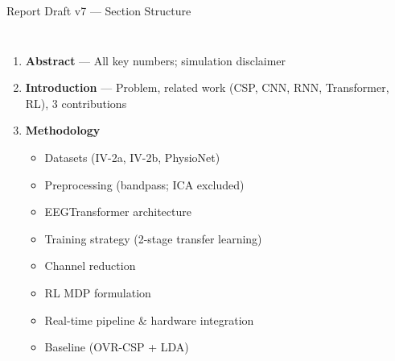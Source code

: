 \documentclass[aspectratio=169, 11pt]{beamer}
\begin{document}
\begin{frame}{Report Draft v7 --- Section Structure}

    \begin{columns}[T]
        \begin{enumerate}
            \item \textbf{Abstract} --- All key numbers; simulation disclaimer
            \item \textbf{Introduction} --- Problem, related work (CSP, CNN, RNN, Transformer, RL), 3 contributions
            \item \textbf{Methodology}
            \begin{itemize}
                \item Datasets (IV-2a, IV-2b, PhysioNet)
                \item Preprocessing (bandpass; ICA excluded)
                \item EEGTransformer architecture
                \item Training strategy (2-stage transfer learning)
                \item Channel reduction
                \item RL MDP formulation
                \item Real-time pipeline \& hardware integration
                \item Baseline (OVR-CSP + LDA)
            \end{itemize}
        \end{enumerate}


\end{columns}
\end{frame}
\end{document}
